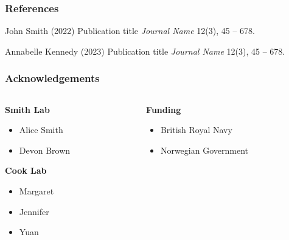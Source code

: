 \documentclass[
	11pt, %
]{beamer}
\begin{document}
\begin{frame} %
	\frametitle{References}
	
	\begin{thebibliography}{99} %
		\footnotesize %
		
			John Smith (2022)
			\newblock Publication title
			\newblock \emph{Journal Name} 12(3), 45 -- 678.
			
			Annabelle Kennedy (2023)
			\newblock Publication title
			\newblock \emph{Journal Name} 12(3), 45 -- 678.
	\end{thebibliography}
\end{frame}

\begin{frame}
	\frametitle{Acknowledgements}
	
	\begin{columns}[t] %
		\begin{column}{0.45\textwidth} %
			\textbf{Smith Lab}
			\begin{itemize}
				\item Alice Smith
				\item Devon Brown
			\end{itemize}
			\textbf{Cook Lab}
			\begin{itemize}
				\item Margaret
				\item Jennifer
				\item Yuan
			\end{itemize}
		\end{column}		
		\begin{column}{0.5\textwidth} %
			\textbf{Funding}
			\begin{itemize}
				\item British Royal Navy
				\item Norwegian Government
			\end{itemize}
		\end{column}
	\end{columns}
\end{frame}
\end{document}
